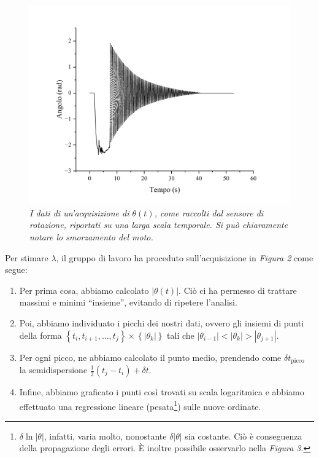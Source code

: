\documentclass{article}
\begin{document}
\begin{center}
    \begin{figure}[H]
        \includegraphics[trim={2cm 1cm 2cm 2.1cm},clip,width=\textwidth]{img/Exp1.jpg}
        \caption[]{\emph{
            I dati di un'acquisizione di $\theta(t)$,
            come raccolti dal sensore di rotazione,
            riportati su una larga scala temporale.
            Si può chiaramente notare lo smorzamento del moto.
        }}
    \end{figure}
\end{center}

Per stimare $\lambda$, il gruppo di lavoro ha proceduto
sull'acquisizione in \emph{Figura 2} come segue:
\begin{enumerate}
    \item
        Per prima cosa, abbiamo calcolato $\left|\theta(t)\right|$.
        Ciò ci ha permesso di trattare massimi e minimi “insieme”,
        evitando di ripetere l'analisi.
    \item
        Poi, abbiamo individuato i picchi dei nostri dati, ovvero
        gli insiemi di punti della forma
        $\left\{t_i,t_{i+1},\dots,t_j\right\}\times\left\{\left|\theta_k\right|\right\}$
        tali che $\left|\theta_{i-1}\right| < \left|\theta_k\right| > \left|\theta_{j+1}\right|$.
    \item
        Per ogni picco, ne abbiamo calcolato il punto medio,
        prendendo come $\delta t_\text{picco}$ la semidispersione $\frac{1}{2}(t_j - t_i) + \delta t$.
    \item
        Infine, abbiamo graficato i punti così trovati
        su scala logaritmica e
        abbiamo effettuato una regressione lineare (pesata\footnote{
            $\delta\!\ln{\left|\theta\right|}$, infatti, varia molto,
            nonostante $\delta\!\left|\theta\right|$ sia costante.
            Ciò è conseguenza della propagazione degli errori.
            È inoltre possibile osservarlo nella \emph{Figura 3}.
        })
        sulle nuove ordinate.
\end{enumerate}
\end{document}
